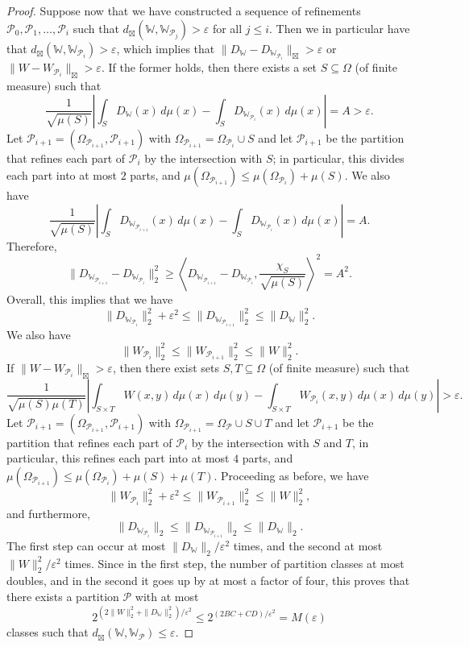 \documentclass{amsart}
\numberwithin{equation}{section}
\numberwithin{figure}{section}
\theoremstyle{definition}
\theoremstyle{remark}
\newcommand{\eps}{\varepsilon}
\newcommand{\cP}{\mathcal{P}}
\newcommand{\cW}{\mathbb{W}}
\newcommand{\sP}{\mathscr{P}}
\begin{document}
\begin{proof}
Suppose now that we have constructed a sequence of refinements
$\sP_0,\sP_1,\dots,\sP_i$ such that $d_\boxtimes(\cW,\cW_{\sP_j}) >\eps$ for
all $j\leq i$. Then we in particular have that $d_\boxtimes(\cW,\cW_{\sP_i})
>\eps$, which implies that $\|D_\cW-D_{\cW_{\sP_i}}\|_\boxtimes >
\varepsilon$ or $\|W-W_{\sP_i}\|_{\boxtimes} > \varepsilon$. If the former
holds, then there exists a set $S \subseteq \Omega$ (of finite measure) such
that
\begin{equation}
\label{D-jbl>eps}
\frac{1}{\sqrt{\mu(S)}}\left|\int_{S} D_\cW(x)\,d\mu(x)-\int_{S} D_{\cW_{\sP_{{i}}}}(x)\,d\mu(x)\right|=A>\eps.
\end{equation}
Let $\sP_{i+1}=(\Omega_{{\sP_{i+1}}},\cP_{i+1})$ with
$\Omega_{{\sP_{i+1}}}=\Omega_{\sP_{i}} \cup S$ and let $\cP_{i+1}$ be the
partition that refines each part of $\cP_{i}$ by the intersection with $S$;
in particular, this divides each part into at most $2$ parts, and
$\mu(\Omega_{{\sP_{i+1}}}) \le \mu(\Omega_{\sP_{i}})+\mu(S)$. We also have
\[\frac{1}{\sqrt{\mu(S)}}\left|\int_{S} D_{\cW_{{\sP_{i+1}}}}(x)\,d\mu(x)-\int_{S}
D_{\cW_{\sP_{i}}}(x)\,d\mu(x)\right|=A
.\]
Therefore,
\[\|D_{\cW_{{\sP_{i+1}}}}-D_{\cW_{\sP_{i}}}\|_2^2 \ge \left\langle D_{\cW_{{\sP_{i+1}}}}-D_{\cW_{\sP_{i}}},\frac{\chi_{S}}{\sqrt{\mu(S)}}
\right\rangle^2=A^2
.\]
Overall, this implies that we have
\[\|D_{\cW_{\sP_{i}}}\|_2^2+{\eps^2} \le \|D_{\cW_{{\sP_{i+1}}}}\|_2^2 \le \|D_{\cW}\|_2^2
.\]
We also have
\[
\|W_{\sP_i}\|_2^2 \le \|W_{\sP_{i+1}}\|_2^2 \le \|W\|_2^2 .\] If
$\|W-W_{\sP_i}\|_{\boxtimes} > \varepsilon$, then there exist sets $S,T
\subseteq \Omega$ (of finite measure) such that
\begin{equation}
\label{W-jbl>eps}
\frac{1}{\sqrt{\mu(S)\mu(T)}}\left|\int_{S \times T} W(x,y)\,d\mu(x)\,d\mu(y)-\int_{S \times T}
W_{\sP_{i}}(x,y)\,d\mu(x)\,d\mu(y)\right|>\eps.
\end{equation}
Let $\sP_{{i+1}}=(\Omega_{\sP_{i+1}},\cP_{i+1})$ with
$\Omega_{\sP_{i+1}}=\Omega_\sP \cup S \cup T$ and let $\cP_{i+1}$ be the
partition that refines each part of $\cP_{i}$ by the intersection with $S$
and $T$, in particular, this refines each part into at most $4$ parts, and
$\mu(\Omega_{\sP_{i+1}}) \le \mu(\Omega_{\sP_{i}})+\mu(S)+\mu(T)$. Proceeding
as before, we have
\[\|W_{\sP_{i}}\|_2^2+\varepsilon^2 \le \|W_{\sP_{i+1}}\|_2^2 \le \|W\|_2^2
,\] and furthermore,
\[\|D_{\cW_{\sP_i}}\|_2 \le \|D_{\cW_{\sP_{i+1}}}\|_2 \le
\|D_{\cW}\|_2 .\] The first step can occur at most
${\|D_\cW\|_2}/{\varepsilon^2}$ times, and the second at most ${\|W\|_2^2
}/{\varepsilon^2}$ times. Since in the first step, the number of partition
classes at most doubles, and in the second it goes up by at most a factor of
four, this proves that there exists a partition $\sP$ with at most
\[
2^{(2\|W\|_2^2+\|D_\cW\|_2^2)/\eps^2}\leq2^{(2BC+CD)/\eps^2}=M(\eps)
\]
classes such that $d_\boxtimes(\cW,\cW_{\sP})\leq \eps$.


\end{proof}
\end{document}
